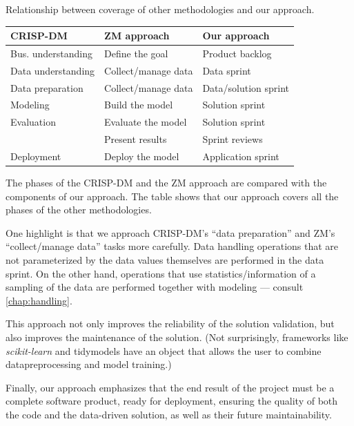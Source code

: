 \begin{tablebox}[label=tab:phases]{Relationship between coverage of other methodologies and our approach.}
  \centering
  \small %
  \begin{tabular}{lll}
    \toprule
    \textbf{CRISP-DM} & \textbf{ZM approach} & \textbf{Our approach} \\
    \midrule
    Bus. understanding & Define the goal & Product backlog \\
    Data understanding & Collect/manage data & Data sprint \\
    Data preparation & Collect/manage data & Data/solution sprint \\
    Modeling & Build the model & Solution sprint \\
    Evaluation & Evaluate the model & Solution sprint \\
    & Present results & Sprint reviews \\
    Deployment & Deploy the model & Application sprint \\
    \bottomrule
  \end{tabular}
  \tcblower
  The phases of the CRISP-DM and the ZM approach are compared with the components of our
  approach.  The table shows that our approach covers all the phases of the other
  methodologies.
\end{tablebox}

One highlight is that we approach CRISP-DM's ``data preparation'' and ZM's
``collect/manage data'' tasks more carefully.  Data handling operations that are not
parameterized by the data values themselves are performed in the data sprint.  On the other hand,
operations that use statistics/information of a sampling of the data are performed
together with modeling --- consult \cref{chap:handling}.

This approach not only improves the reliability of the solution validation, but also improves
the maintenance of the solution.  (Not surprisingly, frameworks like \textit{scikit-learn} and
tidymodels have an object that allows the user to combine \gls{datapreprocessing} and
model training.)


Finally, our approach emphasizes that the end result of the project must be a complete
software product, ready for deployment, ensuring the quality of both the code and the
data-driven solution, as well as their future maintainability.

